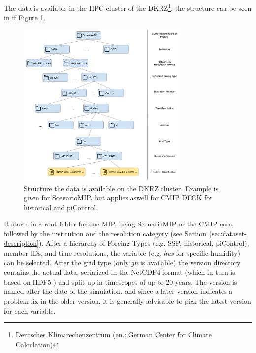 The data is available in the HPC cluster of the DKRZ\footnote{Deutsches Klimarechenzentrum (en.: German Center for Climate Calculation)}, the structure can be seen in if Figure \ref{fig:data-structure}.

\begin{figure}[htb]
  \begin{center}
    \includegraphics[width=0.75\textwidth]{figures/data_structure.png}
  \end{center}
  \caption{Structure the data is available on the DKRZ cluster. Example is given for ScenarioMIP, but applies aswell for CMIP DECK for historical and piControl.}\label{fig:data-structure}
\end{figure}

It starts in a root folder for one MIP, being ScenarioMIP or the CMIP core, followed by the institution and the resolution category (see Section~\ref{sec:dataset-description}). 
After a hierarchy of Forcing Types (e.g. SSP, historical, piControl), member IDs, and time resolutions, the variable (e.g. \textit{hus} for specific humidity) can be selected. 
After the grid type (only \textit{gn} is available) the version directory contains the actual data, serialized in the NetCDF4 format (which in turn is based on HDF5 \cite{folk_overview_2011}) and  split up in timescopes of up to 20 years. 
The version is named after the date of the simulation, and since a later version indicates a problem fix in the older version, it is generally advisable to pick the latest version for each variable. 


